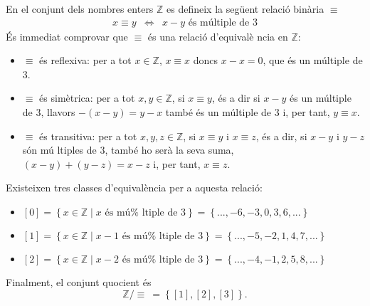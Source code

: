 \begin{exem}
En el conjunt dels nombres enters $\mathbb{Z}$ es defineix la seg\"{u}ent
relaci\'{o} bin\`{a}ria $\equiv$%
\begin{equation*}
\begin{array}{ccc}
x\equiv y & \Longleftrightarrow & x-y\text{ \'{e}s m\'{u}ltiple de }3%
\end{array}
\end{equation*}
\'{E}s immediat comprovar que $\equiv$ \'{e}s una relaci\'{o} d'equival\`{e}%
ncia en $\mathbb{Z}$:

\begin{itemize}
\item $\equiv$ \'{e}s reflexiva: per a tot $x\in\mathbb{Z}$, $x\equiv x$
doncs $x-x=0$, que \'{e}s un m\'{u}ltiple de $3$.

\item $\equiv$ \'{e}s sim\`{e}trica: per a tot $x,y\in\mathbb{Z}$, si $%
x\equiv y$, \'{e}s a dir si $x-y$ \'{e}s un m\'{u}ltiple de $3$, llavors $%
-(x-y)=y-x$ tamb\'{e} \'{e}s un m\'{u}ltiple de $3$ i, per tant, $y\equiv x$.

\item $\equiv$ \'{e}s transitiva: per a tot $x,y,z\in\mathbb{Z}$, si $%
x\equiv y$ i $x\equiv z$, \'{e}s a dir, si $x-y$ i $y-z$ s\'{o}n m\'{u}%
ltiples de $3$, tamb\'{e} ho ser\`{a} la seva suma, $(x-y)+(y-z)=x-z$ i, per
tant, $x\equiv z$.
\end{itemize}

Existeixen tres classes d'equival\`{e}ncia per a aquesta relaci\'{o}:

\begin{itemize}
\item $\left[ 0\right] =\left\{ x\in\mathbb{Z}\mid x\text{ \'{e}s m\'{u}%
ltiple de }3\right\} =\left\{ ...,-6,-3,0,3,6,...\right\} $

\item $\left[ 1\right] =\left\{ x\in\mathbb{Z}\mid x-1\text{ \'{e}s m\'{u}%
ltiple de }3\right\} =\left\{ ...,-5,-2,1,4,7,...\right\} $

\item $\left[ 2\right] =\left\{ x\in\mathbb{Z}\mid x-2\text{ \'{e}s m\'{u}%
ltiple de }3\right\} =\left\{ ...,-4,-1,2,5,8,...\right\} $
\end{itemize}

Finalment, el conjunt quocient \'{e}s%
\begin{equation*}
\mathbb{Z}/\equiv~=\left\{ \left[ 1\right] ,\left[ 2\right] ,\left[ 3\right]
\right\} \text{.}
\end{equation*}
\end{exem}

